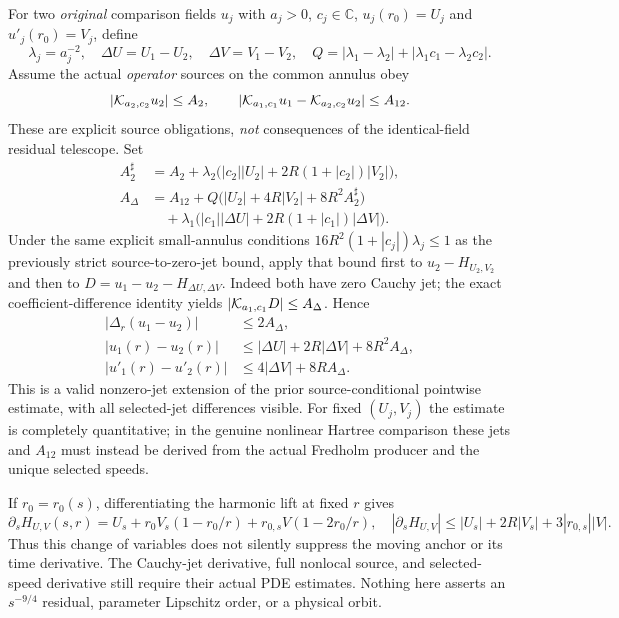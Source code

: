 For two \emph{original} comparison fields $u_j$ with
$a_j>0$, $c_j\in\mathbb C$, $u_j(r_0)=U_j$ and
$u'_j(r_0)=V_j$, define
\[
 \lambda_j=a_j^{-2},\quad
 \Delta U=U_1-U_2,\quad\Delta V=V_1-V_2,\quad
 Q=|\lambda_1-\lambda_2|+|\lambda_1c_1-\lambda_2c_2|.
\]
Assume the actual \emph{operator} sources on the common annulus obey
\[
 |{\cal K}_{a_2,c_2}u_2|\le A_2,\qquad
 |{\cal K}_{a_1,c_1}u_1-
       {\cal K}_{a_2,c_2}u_2|\le A_{12}.
\]
These are explicit source obligations, \emph{not} consequences of
the identical-field residual telescope.  Set
\begin{align*}
 A_2^\sharp
 &=A_2+\lambda_2
       \bigl(|c_2||U_2|+2R(1+|c_2|)|V_2|\bigr),\\
 A_\Delta
 &=A_{12}
   +Q\bigl(|U_2|+4R|V_2|+8R^2A_2^\sharp\bigr)\\
 &\quad+\lambda_1
   \bigl(|c_1||\Delta U|+
                     2R(1+|c_1|)|\Delta V|\bigr).
\end{align*}
Under the same explicit small-annulus conditions
$16R^2(1+|c_j|)\lambda_j\le1$ as the previously
strict source-to-zero-jet bound, apply that bound first to
$u_2-H_{U_2,V_2}$ and then to
$D=u_1-u_2-H_{\Delta U,\Delta V}$.
Indeed both have zero Cauchy jet; the exact coefficient-difference
identity yields $|{\cal K}_{a_1,c_1}D|\le A_\Delta$.
Hence
\begin{equation}
 \begin{split}
 |\Delta_r(u_1-u_2)|&\le2A_\Delta,\\
 |u_1(r)-u_2(r)|&\le
                  |\Delta U|+2R|\Delta V|+8R^2A_\Delta,\\
 |u'_1(r)-u'_2(r)|&\le4|\Delta V|+8RA_\Delta.
 \end{split}
 \label{eq:nonzero-jet-harmonic-lift-comparison}
\end{equation}
This is a valid nonzero-jet extension of the prior
source-conditional pointwise estimate, with all selected-jet
differences visible. For fixed $(U_j,V_j)$ the estimate is
completely quantitative; in the genuine nonlinear Hartree
comparison these jets and $A_{12}$ must instead be derived
from the actual Fredholm producer and the unique selected speeds.

If $r_0=r_0(s)$, differentiating the harmonic lift at fixed
$r$ gives
\[
 \partial_s H_{U,V}(s,r)
 =U_s+r_0V_s(1-r_0/r)+r_{0,s}V(1-2r_0/r),
\quad
 |\partial_sH_{U,V}|
 \le |U_s|+2R|V_s|+3|r_{0,s}||V|.
\]
Thus this change of variables does not silently suppress the
moving anchor or its time derivative.  The Cauchy-jet derivative,
full nonlocal source, and selected-speed derivative still require
their actual PDE estimates.  Nothing here asserts an
$s^{-9/4}$ residual, parameter Lipschitz order, or a physical orbit.

